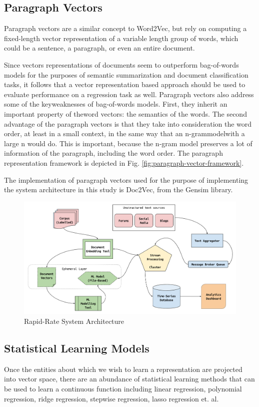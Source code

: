 \documentclass[conference]{IEEEtran}
\begin{document}
\subsection{Paragraph Vectors}
Paragraph vectors are a similar concept to Word2Vec, but rely on computing a fixed-length vector representation of a variable length group of words, which could be a sentence, a paragraph, or even an entire document.

Since vectors representations of documents seem to outperform bag-of-words models for the purposes of semantic summarization and document classification tasks, it follows that a vector representation based approach should be used to evaluate performance on a regression task as well. Paragraph vectors also address some of the keyweaknesses of bag-of-words models. First, they inherit an important property of theword vectors: the semantics of the words. The second advantage of the paragraph vectors is that they take into consideration the word order, at least in a small context, in the same way that an n-grammodelwith a large n would do. This is important, because the n-gram model preserves a lot of information of the paragraph, including the word order\cite{le2014distributed}. The paragraph representation framework is depicted in Fig. \ref{fig:paragraph-vector-framework}.

The implementation of paragraph vectors used for the purpose of implementing the system architecture in this study is Doc2Vec, from the Gensim library\cite{doc2vec_api}.

\begin{figure}[ht]
\centering
\includegraphics[width=\textwidth]{images/rapid_rate_system_arch_1.png}
\caption{Rapid-Rate System Architecture}
\label{fig:system-architecture}
\end{figure}

\subsection{Statistical Learning Models}
Once the entities about which we wish to learn a representation are projected into vector space, there are an abundance of statistical learning methods that can be used to learn a continuous function including linear regression, polynomial regression, ridge regression, stepwise regression, lasso regression et. al.
\end{document}
